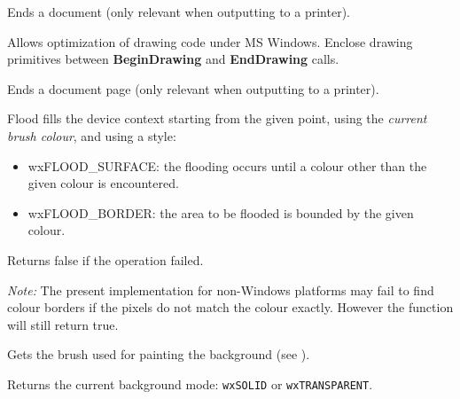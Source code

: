 \label{wxdcenddoc}


Ends a document (only relevant when outputting to a printer).


\label{wxdcenddrawing}


Allows optimization of drawing code under MS Windows. Enclose
drawing primitives between {\bf BeginDrawing} and {\bf EndDrawing}\rtfsp
calls.


\label{wxdcendpage}


Ends a document page (only relevant when outputting to a printer).


\label{wxdcfloodfill}


Flood fills the device context starting from the given point, using
the {\it current brush colour}, and using a style:

\begin{itemize}\itemsep=0pt
\item wxFLOOD\_SURFACE: the flooding occurs until a colour other than the given colour is encountered.
\item wxFLOOD\_BORDER: the area to be flooded is bounded by the given colour.
\end{itemize}

Returns false if the operation failed.

{\it Note:} The present implementation for non-Windows platforms may fail to find
colour borders if the pixels do not match the colour exactly. However the
function will still return true.


\label{wxdcgetbackground}


Gets the brush used for painting the background (see ).


\label{wxdcgetbackgroundmode}


Returns the current background mode: {\tt wxSOLID} or {\tt wxTRANSPARENT}.

